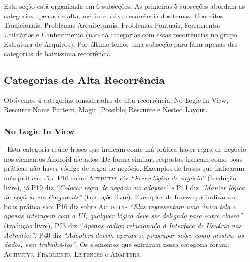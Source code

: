 Esta se\c{c}\~ao est\'a organizada em 6 subse\c{c}\~oes. As primeiras 5 subse\c{c}\~oes abordam as categorias apenas de alta, m\'edia e baixa recorr\^encia dos temas: Conceitos Tradicionais, Problemas Arquiteturais, Problemas Pontuais, Ferramentas Utilit\'arias e Conhecimento (n\~ao h\'a categorias com essas recorr\^encias no grupo Estrutura de Arquivos). Por \'ultimo temos uma subse\c{c}\~ao para falar apenas das categorias de baix\'issima recorr\^encia.

\subsection{Categorias de Alta Recorr\^encia}
Obtivemos 4 categorias consideradas de alta recorr\^encia: No Logic In View, Resource Name Pattern, Magic [Possible] Resource e Nested Layout.

\subsubsection{No Logic In View} \
Esta categoria re\'une frases que indicam como m\'a pr\'atica haver regra de neg\'ocio nos elementos Android afetados. De forma similar, respostas indicam  como boas pr\'aticas n\~ao haver c\'odigo de regra de neg\'ocio. Exemplos de frases que indicaram m\'as pr\'aticas s\~ao: P16 sobre \textsc{Activitys} diz \textit{``Fazer l\'ogica de neg\'ocio''} (tradu\c{c}\~ao livre), j\'a P19 diz \textit{``Colocar regra de neg\'ocio no adapter''} e P11 diz \textit{``Manter l\'ogica de neg\'ocio em Fragments''} (tradu\c{c}\~ao livre). Exemplos de frases que indicaram boas pr\'atica s\~ao: P16 diz sobre \textsc{Activitys} \textit{``Elas representam uma \'unica tela e apenas interagem com a UI, qualquer l\'ogica deve ser delegada para outra classe''} (tradu\c{c}\~ao livre), P23 diz \textit{``Apenas c\'odigo relacionado \`a Interface de Usu\'ario nas Activities''}, P40 diz \textit{``Adapters devem apenas se preocupar sobre como mostrar os dados, sem trabalh\'a-los''}. Os elementos que entraram nessa categoria foram: \textsc{Activitys}, \textsc{Fragments}, \textsc{Listeners} e \textsc{Adapters}. 



